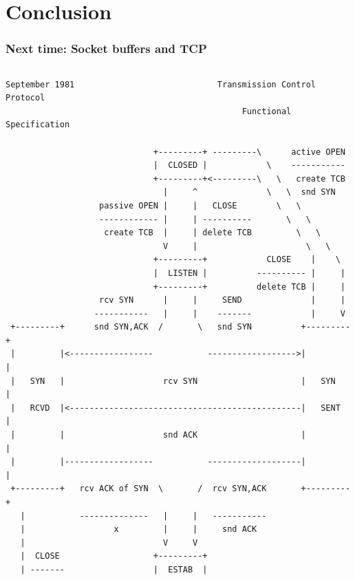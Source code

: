 \section{Conclusion}

\begin{frame}[fragile]
  \frametitle{Next time: Socket buffers and TCP}

  \begin{columns}[T]

  \begin{Tiny}
    \begin{verbatim}
September 1981                             Transmission Control Protocol
                                                Functional Specification

                              +---------+ ---------\      active OPEN  
                              |  CLOSED |            \    -----------  
                              +---------+<---------\   \   create TCB  
                                |     ^              \   \  snd SYN    
                   passive OPEN |     |   CLOSE        \   \           
                   ------------ |     | ----------       \   \         
                    create TCB  |     | delete TCB         \   \       
                                V     |                      \   \     
                              +---------+            CLOSE    |    \   
                              |  LISTEN |          ---------- |     |  
                              +---------+          delete TCB |     |  
                   rcv SYN      |     |     SEND              |     |  
                  -----------   |     |    -------            |     V  
 +---------+      snd SYN,ACK  /       \   snd SYN          +---------+
 |         |<-----------------           ------------------>|         |
 |   SYN   |                    rcv SYN                     |   SYN   |
 |   RCVD  |<-----------------------------------------------|   SENT  |
 |         |                    snd ACK                     |         |
 |         |------------------           -------------------|         |
 +---------+   rcv ACK of SYN  \       /  rcv SYN,ACK       +---------+
   |           --------------   |     |   -----------                  
   |                  x         |     |     snd ACK                    
   |                            V     V                                
   |  CLOSE                   +---------+                              
   | -------                  |  ESTAB  |                              

\end{verbatim}
\end{Tiny}
\end{columns}
\end{frame}
